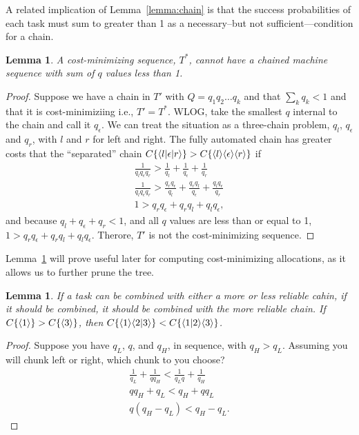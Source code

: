 \documentclass{article}
\newtheorem{lemma}[theorem]{Lemma}
\begin{document}
A related implication of Lemma~\ref{lemma:chain} is that the success probabilities of each task must sum to greater than 1 as a necessary--but not sufficient---condition for a chain.

\begin{lemma} \label{lemma:sum1}
A cost-minimizing sequence, $T^*$, cannot have a chained machine sequence with sum of $q$ values less than 1.
\end{lemma}
\begin{proof}
  Suppose we have a chain in $T'$ with $Q = q_1 q_2\ldots q_k$ and that $\sum_k q_k < 1$ and that it is cost-minimiziing i.e., $T' = T^*$.
  WLOG, take the smallest $q$ internal to the chain and call it $q_\epsilon$.
  We can treat the situation as a three-chain problem, $q_l$, $q_\epsilon$ and $q_r$, with $l$ and $r$ for left and right.
  The fully automated chain has greater costs that the ``separated'' chain $C\{ \langle l|\epsilon|r \rangle \} > C\{ \langle l \rangle\langle \epsilon \rangle\langle r \rangle \}$ if
\begin{align}
  \frac{1}{q_lq_{\epsilon}q_r} > \frac{1}{q_l} + \frac{1}{q_\epsilon} + \frac{1}{q_r}  \nonumber \\
   \frac{1}{q_lq_{\epsilon}q_r} > \frac{q_r q_\epsilon}{q_l} + \frac{q_rq_l}{q_\epsilon} + \frac{q_lq_\epsilon}{q_r} \nonumber \\
   1 > q_r q_\epsilon + q_rq_l + q_lq_\epsilon \nonumber,
\end{align}
and because $q_l + q_\epsilon + q_r < 1$, and all $q$ values are less than or equal to 1, $1 > q_r q_\epsilon + q_rq_l + q_lq_\epsilon$.
Therore, $T'$ is not the cost-minimizing sequence.
\end{proof}

Lemma~\ref{lemma:sum1} will prove useful later for computing cost-minimizing allocations, as it allows us to further prune the tree.  

\begin{lemma} \label{lemma:pair_better}
 If a task can be combined with either a more or less reliable cahin, if it should be combined, it should be combined with the more reliable chain.
 If $C\{ \langle 1 \rangle \} > C\{ \langle 3 \rangle \}$, then $C\{ \langle 1 \rangle\langle 2|3 \rangle \} < C\{ \langle 1|2 \rangle\langle 3 \rangle \}$.
 \end{lemma}
\begin{proof}
Suppose you have $q_L$, $q$, and $q_H$, in sequence, with $q_H > q_L$.
Assuming you will chunk left or right, which chunk to you choose?
\begin{align}
 \frac{1}{q_L} + \frac{1}{q q_H} < \frac{1}{q_L q} + \frac{1}{q_H} \\
  q q_H + q_L < q_H + q q_L \\
  q (q_H  - q_L) < q_H - q_L.
\end{align}
\end{proof}
\end{document}
